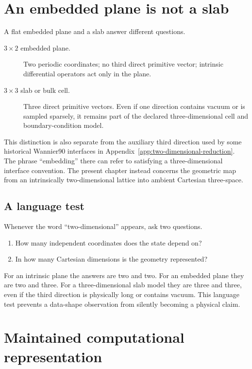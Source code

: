 \section{An embedded plane is not a slab}

A flat embedded plane and a slab answer different questions.

\begin{description}
  \item[$3\times2$ embedded plane.] Two periodic coordinates; no third direct
    primitive vector; intrinsic differential operators act only in the plane.
  \item[$3\times3$ slab or bulk cell.] Three direct primitive vectors. Even if
    one direction contains vacuum or is sampled sparsely, it remains part of
    the declared three-dimensional cell and boundary-condition model.
\end{description}

This distinction is also separate from the auxiliary third direction used by
some historical Wannier90 interfaces in
Appendix~\ref{app:two-dimensional-reduction}. The phrase ``embedding'' there
can refer to satisfying a three-dimensional interface convention. The present
chapter instead concerns the geometric map from an intrinsically
two-dimensional lattice into ambient Cartesian three-space.

\subsection{A language test}

Whenever the word ``two-dimensional'' appears, ask two questions.

\begin{enumerate}
  \item How many independent coordinates does the state depend on?
  \item In how many Cartesian dimensions is the geometry represented?
\end{enumerate}

For an intrinsic plane the answers are two and two. For an embedded plane they
are two and three. For a three-dimensional slab model they are three and three,
even if the third direction is physically long or contains vacuum. This
language test prevents a data-shape observation from silently becoming a
physical claim.

\section{Maintained computational representation}

